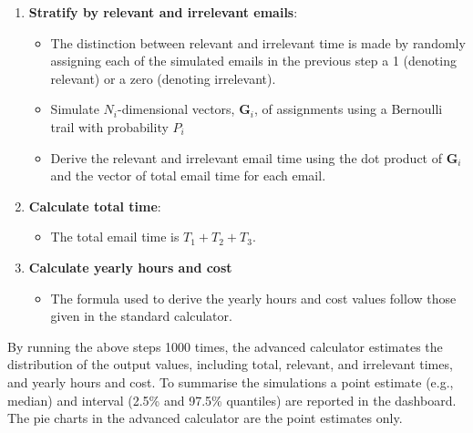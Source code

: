 \documentclass[
  reportpaper,
  DIV=11,
  numbers=noendperiod]{scrartcl}
\providecommand{\tightlist}{%
  \setlength{\itemsep}{0pt}\setlength{\parskip}{0pt}}\usepackage{longtable,booktabs,array}
\begin{document}
\begin{enumerate}
\def\labelenumi{\arabic{enumi}.}
\setcounter{enumi}{4}
\tightlist
\item
  \textbf{Stratify by relevant and irrelevant emails}:

  \begin{itemize}
  \tightlist
  \item
    The distinction between relevant and irrelevant time is made by
    randomly assigning each of the simulated emails in the previous step
    a 1 (denoting relevant) or a zero (denoting irrelevant).
  \item
    Simulate \(N_i\)-dimensional vectors, \(\boldsymbol{G}_i\), of
    assignments using a Bernoulli trail with probability \(P_i\)
  \item
    Derive the relevant and irrelevant email time using the dot product
    of \(\boldsymbol{G}_i\) and the vector of total email time for each
    email.
  \end{itemize}
\item
  \textbf{Calculate total time}:

  \begin{itemize}
  \tightlist
  \item
    The total email time is \(T_1 + T_2 + T_3\).
  \end{itemize}
\item
  \textbf{Calculate yearly hours and cost}

  \begin{itemize}
  \tightlist
  \item
    The formula used to derive the yearly hours and cost values follow
    those given in the standard calculator.
  \end{itemize}
\end{enumerate}

By running the above steps 1000 times, the advanced calculator estimates
the distribution of the output values, including total, relevant, and
irrelevant times, and yearly hours and cost. To summarise the
simulations a point estimate (e.g., median) and interval (2.5\% and
97.5\% quantiles) are reported in the dashboard. The pie charts in the
advanced calculator are the point estimates only.
\end{document}
